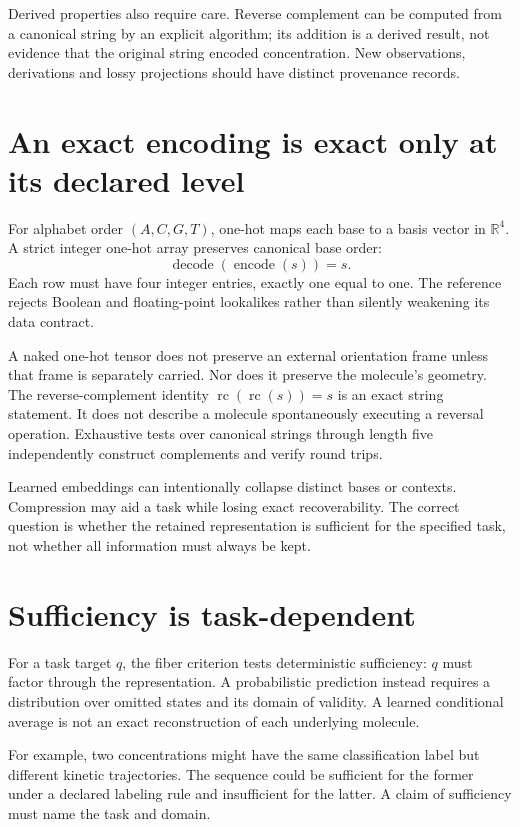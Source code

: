 Derived properties also require care. Reverse complement can be computed from
a canonical string by an explicit algorithm; its addition is a derived result,
not evidence that the original string encoded concentration. New observations,
derivations and lossy projections should have distinct provenance records.

\section{An exact encoding is exact only at its declared level}
For alphabet order $(A,C,G,T)$, one-hot maps each base to a basis vector in
$\mathbb R^4$. A strict integer one-hot array preserves canonical base order:
\[
 \operatorname{decode}(\operatorname{encode}(s))=s.
\]
Each row must have four integer entries, exactly one equal to one.
The reference rejects Boolean and floating-point lookalikes rather than
silently weakening its data contract.

A naked one-hot tensor does not preserve an external orientation frame unless
that frame is separately carried. Nor does it preserve the molecule's geometry.
The reverse-complement identity $\operatorname{rc}(\operatorname{rc}(s))=s$
is an exact string statement. It does not describe a molecule spontaneously
executing a reversal operation. Exhaustive tests over canonical strings through
length five independently construct complements and verify round trips.

Learned embeddings can intentionally collapse distinct bases or contexts.
Compression may aid a task while losing exact recoverability. The correct
question is whether the retained representation is sufficient for the specified
task, not whether all information must always be kept.

\section{Sufficiency is task-dependent}
For a task target $q$, the fiber criterion tests deterministic sufficiency:
$q$ must factor through the representation. A probabilistic prediction instead
requires a distribution over omitted states and its domain of validity.
A learned conditional average is not an exact reconstruction of each underlying
molecule.

For example, two concentrations might have the same classification label but
different kinetic trajectories. The sequence could be sufficient for the former
under a declared labeling rule and insufficient for the latter. A claim of
sufficiency must name the task and domain.

